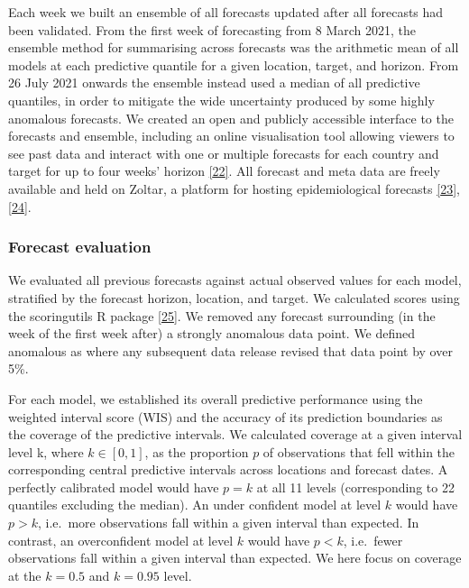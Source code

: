 \documentclass[
]{article}
\begin{document}
Each week we built an ensemble of all forecasts updated after all
forecasts had been validated. From the first week of forecasting from 8
March 2021, the ensemble method for summarising across forecasts was the
arithmetic mean of all models at each predictive quantile for a given
location, target, and horizon. From 26 July 2021 onwards the ensemble
instead used a median of all predictive quantiles, in order to mitigate
the wide uncertainty produced by some highly anomalous forecasts. We
created an open and publicly accessible interface to the forecasts and
ensemble, including an online visualisation tool allowing viewers to see
past data and interact with one or multiple forecasts for each country
and target for up to four weeks' horizon
\protect\hyperlink{ref-europeancovid-19forecasthubEuropeanCovid19Forecast}{{[}22{]}}.
All forecast and meta data are freely available and held on Zoltar, a
platform for hosting epidemiological forecasts
\protect\hyperlink{ref-epiforecastsProjectECDCEuropean2021}{{[}23{]}},
\protect\hyperlink{ref-reichZoltarForecastArchive2021}{{[}24{]}}.

\hypertarget{forecast-evaluation}{%
\subsubsection{Forecast evaluation}\label{forecast-evaluation}}

We evaluated all previous forecasts against actual observed values for
each model, stratified by the forecast horizon, location, and target. We
calculated scores using the scoringutils R package
\protect\hyperlink{ref-nikosibosseScoringutilsUtilitiesScoring2020}{{[}25{]}}.
We removed any forecast surrounding (in the week of the first week
after) a strongly anomalous data point. We defined anomalous as where
any subsequent data release revised that data point by over 5\%.

For each model, we established its overall predictive performance using
the weighted interval score (WIS) and the accuracy of its prediction
boundaries as the coverage of the predictive intervals. We calculated
coverage at a given interval level k, where \(k\in[0,1]\), as the
proportion \(p\) of observations that fell within the corresponding
central predictive intervals across locations and forecast dates. A
perfectly calibrated model would have \(p=k\) at all 11 levels
(corresponding to 22 quantiles excluding the median). An under confident
model at level \(k\) would have \(p>k\), i.e.~more observations fall
within a given interval than expected. In contrast, an overconfident
model at level \(k\) would have \(p<k\), i.e.~fewer observations fall
within a given interval than expected. We here focus on coverage at the
\(k=0.5\) and \(k=0.95\) level.
\end{document}
